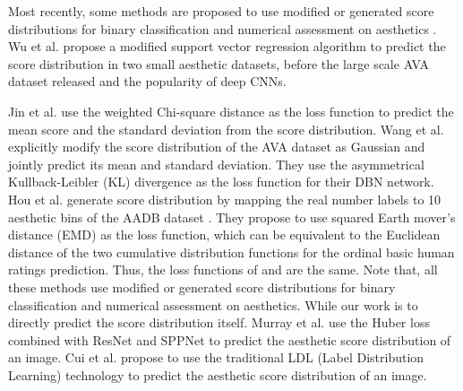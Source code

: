 \documentclass[letterpaper]{article} %
\begin{document}
Most recently, some methods are proposed to use modified or generated score distributions for binary classification and numerical assessment on aesthetics \cite{JinICIP2016,WangIJCNN2017,HouArXiv2016}. Wu et al. \cite{WuICCV2011} propose a modified support vector regression algorithm to predict the score distribution in two small aesthetic datasets, before the large scale AVA dataset released and the popularity of deep CNNs.

Jin et al. \cite{JinICIP2016} use the weighted Chi-square distance as the loss function to predict the mean score and the standard deviation from the score distribution. Wang et al. \cite{WangIJCNN2017} explicitly modify the score distribution of the AVA dataset as Gaussian and jointly predict its mean and standard deviation. They use the asymmetrical  Kullback-Leibler (KL) divergence as the loss function for their DBN network. Hou et al. \cite{HouArXiv2016} generate score distribution by mapping the real number labels to 10 aesthetic bins of the AADB dataset \cite{KongECCV2016}. They propose to use squared Earth mover's distance (EMD) as the loss function, which can be equivalent to the Euclidean distance of the two cumulative distribution functions for the ordinal basic human ratings prediction. Thus, the loss functions of \cite{HouArXiv2016} and \cite{WuICCV2011} are the same. Note that, all these methods use modified or generated score distributions for binary classification and numerical assessment on aesthetics. While our work is to directly predict the score distribution itself. Murray et al. \cite{MurrayArXiv2017} use the Huber loss combined with ResNet and SPPNet to predict the aesthetic score distribution of an image. Cui et al. \cite{CuiSigIR2017} propose to use the traditional LDL (Label Distribution Learning) technology to predict the aesthetic score distribution of an image.
\end{document}
